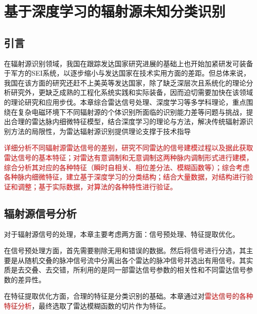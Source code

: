 \chapter{基于深度学习的辐射源未知分类识别}

% 

\section{引言}
在辐射源识别领域，我国在跟踪发达国家研究进展的基础上也开始加紧研发可装备于军方的SEI系统，以逐步缩小与发达国家在技术实用方面的差距。但总体来说，我国在该方面的研究还赶不上美英等发达国家，除了缺乏深层次且系统化的理论分析研究外，更缺乏成熟的工程化系统实践和实际装备，因而迫切需要加快在该领域的理论研究和应用步伐。本章综合雷达信号处理、深度学习等多学科理论，重点围绕在复杂电磁环境下不同辐射源的个体识别所面临的识别能力差等问题与挑战，提出合理的雷达脉内细微特征模型，结合深度学习的理论与方法，解决传统辐射源识别方法的局限性，为雷达辐射源识别提供理论支撑于技术指导

\textcolor{red}{详细分析不同辐射源雷达信号的差别，研究不同雷达的信号建模过程以及据此获取雷达信号的基本特征；对雷达有意调制和无意调制这两种脉内调制形式进行建模，综合分析其对应的各种特征（瞬时自相关、相位差分法、模糊函数等）；综合考虑各种脉内细微特征，建立基于深度学习的分类结构；结合大量数据，对结构进行验证和调整；基于实际数据，对算法的各种特性进行验证。}

\section{辐射源信号分析}

对于辐射源信号的处理，本章主要考虑两方面：信号预处理、特征提取优化。

在信号预处理方面，首先需要剔除无用和错误的数据。然后将信号进行分选，其主要是从随机交叠的脉冲信号流中分离出各个雷达的脉冲信号并选出有用信号。其实质是去交叠、去交错，所利用的是同一部雷达信号参数的相关性和不同雷达信号参数的差异性。

在特征提取优化方面，合理的特征是分类识别的基础。本章通过对\textcolor{red}{雷达信号的各种特征分析}，最终选取了雷达模糊函数的切片作为特征。

